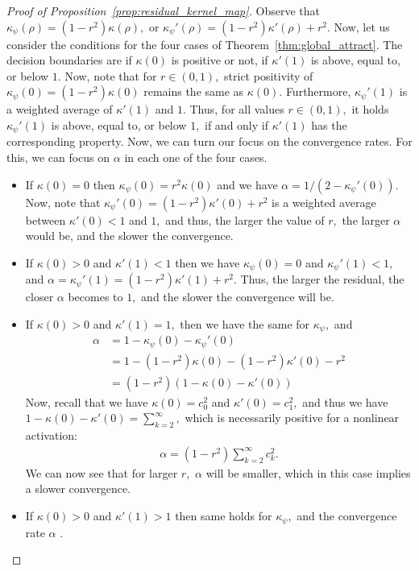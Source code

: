 \documentclass[twoside]{article}
\theoremstyle{definition}
\begin{document}
\begin{proof}[Proof of Proposition~\ref{prop:residual_kernel_map}]
Observe that $\kappa_\psi(\rho) = (1-r^2) \kappa(\rho),$ or $\kappa_\psi'(\rho) = (1-r^2) \kappa'(\rho) + r^2.$ Now, let us consider the conditions for the four cases of Theorem~\ref{thm:global_attract}. The decision boundaries are if $\kappa(0)$ is positive or not, if $\kappa'(1)$ is above, equal to, or below $1.$ Now, note that for $r \in (0,1),$ strict positivity of $\kappa_\psi(0) = (1-r^2) \kappa(0)$ remains the same as $\kappa(0).$ Furthermore, $\kappa_\psi'(1)$ is a weighted average of $\kappa'(1)$ and $1.$ Thus, for all values $r\in(0,1),$ it holds $\kappa_\psi'(1)$ is above, equal to, or below $1,$ if and only if $\kappa'(1)$ has the corresponding property. Now, we can turn our focus on the convergence rates. For this, we can focus on $\alpha$ in each one of the four cases. 
\begin{itemize}
    \item If $\kappa(0)=0$ then $\kappa_\psi(0) = r^2 \kappa(0)$ and we have $\alpha = 1 / (2-\kappa_\psi'(0)).$ Now, note that $\kappa_\psi'(0) = (1-r^2)\kappa'(0) +  r^2$ is a weighted average between $\kappa'(0) < 1$ and $1,$ and thus, the larger the value of $r,$ the larger $\alpha$ would be, and the slower the convergence. 
    \item If $\kappa(0)>0$ and $\kappa'(1)<1$ then we have $\kappa_\psi(0)=0$ and $\kappa_\psi'(1) < 1,$ and $\alpha = \kappa_\psi'(1) = (1-r^2) \kappa'(1) + r^2.$ Thus, the larger the residual, the closer $\alpha$ becomes to $1,$ and the slower the convergence will be.  
    \item If $\kappa(0)>0$ and $\kappa'(1)=1,$ then we have the same for $\kappa_\psi,$ and 
    \begin{align*}
        \alpha &= 1 - \kappa_\psi(0) - \kappa_\psi'(0)\\
        &= 1 - (1-r^2) \kappa(0) - (1-r^2)\kappa'(0) - r^2\\
        &= (1-r^2 )( 1 - \kappa(0) - \kappa'(0))
    \end{align*}
    Now, recall that we have $\kappa(0) = c_0^2$ and $\kappa'(0)=c_1^2,$ and thus we have $1-\kappa(0) - \kappa'(0) = \sum_{k=2}^\infty,$ which is necessarily positive for a nonlinear activation:
    \begin{align*}
        \alpha = (1-r^2) \sum_{k=2}^\infty c_k^2.
    \end{align*}
    We can now see that for larger $r,$ $\alpha $ will be smaller, which in this case implies a slower convergence. 
    \item If $\kappa(0)>0$ and $\kappa'(1) > 1$ then same holds for $\kappa_\psi,$ and the convergence rate $\alpha$ .
\end{itemize}

\end{proof}
\end{document}
